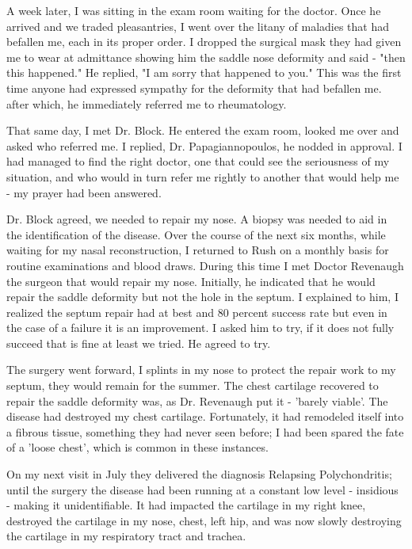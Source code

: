 \documentclass[12pt,a4paper]{book}
\begin{document}
A week later, I was sitting in the exam room waiting for the doctor.  Once he arrived and we traded pleasantries, I went over the litany of maladies that had befallen me, each in its proper order.  I dropped the surgical mask they had given me to wear at admittance showing him the saddle nose deformity and said - "then this happened."  He replied, "I am sorry that happened to you."  This was the first time anyone had expressed sympathy for the deformity that had befallen me.  after which, he immediately referred me to rheumatology.  

That same day, I met Dr. Block.  He entered the exam room, looked me over and asked who referred me.  I replied, Dr. Papagiannopoulos, he nodded in approval.  I had managed to find the right doctor, one that could see the seriousness of my situation, and who would in turn refer me rightly to another that would help me - my prayer had been answered.

Dr. Block agreed, we needed to repair my nose.  A biopsy was needed to aid in the identification of the disease.  Over the course of the next six months, while waiting for my nasal reconstruction, I returned to Rush on a monthly basis for routine examinations and blood draws.   During this time I met Doctor Revenaugh the surgeon that would repair my nose.  Initially, he indicated that he would repair the saddle deformity but not the hole in the septum.   I explained to him, I realized the septum repair had at best and 80 percent success rate but even in the case of a failure it is an improvement.  I asked him to try, if it does not fully succeed that is fine at least we tried.  He agreed to try.

The surgery went forward, I splints in my nose to protect the repair work to my septum, they would remain for the summer.  The chest cartilage recovered to repair the saddle deformity was, as Dr. Revenaugh put it - 'barely viable'.  The disease had destroyed my chest cartilage.  Fortunately, it had remodeled itself into a fibrous tissue, something they had never seen before; I had been spared the fate of a 'loose chest', which is common in these instances.  

On my next visit in July they delivered the diagnosis Relapsing Polychondritis; until the surgery the disease had been running at a constant low level - insidious - making it unidentifiable.  It had impacted the cartilage in my right knee, destroyed the cartilage in my nose, chest, left hip, and was now slowly destroying the cartilage in my respiratory tract and trachea.  
\end{document}
